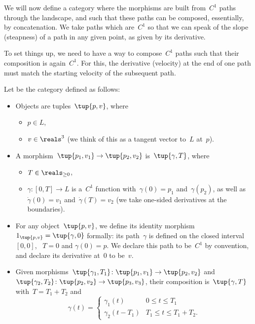 We will now define a category where the morphisms are built from~$C^1$ paths through the landscape, and such that these paths can be composed, essentially, by concatenation. We take paths which are~$C^1$ so that we can speak of the slope (steapness) of a path in any given point, as given by its derivative.

%
%


To set things up, we need to have a way to compose~$C^1$ paths such that their composition is again~$C^1$. For this, the derivative (velocity) at the end of one path must match the starting velocity of the subsequent path.

\begin{definition}[\Berg]\label{def:Berg}
    Let \Berg be the category defined as follows:
    \begin{itemize}
        \item Objects are tuples~$\tup{p,v}$, where
        \begin{itemize}
            \item $p \in L$,
            \item $v \in \reals^3$ (we think of this as a tangent vector to~$L$ at~$p$).
        \end{itemize}

        \item A morphism~$\tup{p_1, v_1} \to \tup{p_2, v_2}$ is~$\tup{\gamma, T}$,
        where
        \begin{itemize}
            \item $T \in \reals_{\geq 0}$,
            \item $\gamma \colon [0, T] \to L$ is a~$C^1$ function with~$\gamma(0)=p_1$ and~$\gamma(p_2)$, as well as~$\dot \gamma(0) = v_1$ and~$\dot \gamma(T) = v_2$  (we take one-sided derivatives at the boundaries).
        \end{itemize}
        \item For any object~$\tup{p, v}$, we define its identity morphism~$1_{\tup{p,v}} = \tup{\gamma, 0}$ formally: its path~$\gamma$ is defined on the closed interval~$[0,0]$, ~$T=0$ and $\gamma(0) = p$. We declare this path to be~$C^1$ by convention, and declare its derivative at~$0$ to be~$v$.

        \item Given morphisms~$\tup{\gamma_1, T_1}\colon \tup{p_1, v_1} \to \tup{p_2, v_2}$ and~$\tup{\gamma_2, T_2}\colon \tup{p_2, v_2} \to \tup{p_3, v_3}$, their composition is~$\tup{\gamma, T}$ with~$T = T_1 + T_2$ and
        \begin{equation}
            \gamma(t) = \begin{cases}
                            \gamma_1(t) &0 \leq t \leq T_1 \\
                            \gamma_2(t - T_1) & T_1 \leq t \leq T_1 + T_2.
            \end{cases}
        \end{equation}
    \end{itemize}
\end{definition}

